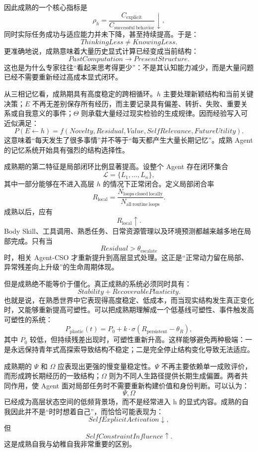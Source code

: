 因此成熟的一个核心指标是
\[
\rho_h
=
\frac{
C_{\mathrm{explicit}}
}{
C_{\mathrm{successful\ behavior}}
}
\downarrow,
\]
同时实际任务成功与适应能力并未下降，甚至持续提高。于是：
\[
\boxed{
ThinkingLess\neq KnowingLess.
}
\]
更准确地说，成熟意味着大量历史显式计算已经变成当前结构：
\[
PastComputation
\rightarrow
PresentStructure.
\]
这也是为什么专家往往“看起来思考得更少”：不是其认知能力减少，而是大量问题已经不需要重新经过高成本显式闭环。

从三相记忆看，成熟期具有高度稳定的跨相循环。$h$ 主要处理新颖结构和当前关键决策；$E$ 不再无差别保存所有经历，而主要记录具有偏差、转折、失败、重要关系或自我意义的事件；$\Theta$ 则承载大量经过现实检验的生成规律。因而经验写入可近似满足：
\[
P(E\leftarrow h)
=
f(
Novelty,
Residual,
Value,
SelfRelevance,
FutureUtility
).
\]
这意味着“每天发生了很多事情”并不等于“每天都产生大量长期记忆”。成熟 Agent 的记忆系统开始具有强烈的结构选择性。

成熟期的第二特征是局部闭环比例显著提高。设整个 Agent 存在闭环集合
\[
\mathcal L
=
\{
L_1,\ldots,L_n
\},
\]
其中一部分能够在不进入高层 $h$ 的情况下正常闭合。定义局部闭合率
\[
R_{\mathrm{local}}
=
\frac{
N_{\mathrm{loops\ closed\ locally}}
}{
N_{\mathrm{all\ routine\ loops}}
}.
\]
成熟以后，应有
\[
R_{\mathrm{local}}\uparrow.
\]
Body Skill、工具调用、熟悉任务、日常资源管理以及环境预测都越来越多地在局部完成。只有当
\[
Residual>\theta_{\mathrm{escalate}}
\]
时，相关 Agent-CSO 才重新提升到高层显式处理。这正是“正常动力留在局部、异常残差向上升级”的生命周期体现。

但是成熟绝不能等价于僵化。真正成熟的系统必须同时具有：
\[
Stability
+
RecoverablePlasticity.
\]
也就是说，在熟悉世界中它表现得高度稳定、低成本，而当现实结构发生真正变化时，又能够重新提高可塑性。可以把成熟期理解成一个低基线可塑性、事件触发高可塑性的系统：
\[
P_{\mathrm{plastic}}(t)
=
P_0
+
k
\cdot
\sigma
\left(
R_{\mathrm{persistent}}-\theta_R
\right),
\]
其中 $P_0$ 较低，但持续残差出现时，可塑性重新升高。这样能够避免两种极端：一是永远保持青年式高探索导致结构不稳定；二是完全停止结构变化导致无法适应。

成熟期的 $\Psi$ 和 $\Omega$ 应表现出更强的慢变量稳定性。$\Psi$ 不再主要依赖单一成败评价，而形成跨长期经历的一致结构；$\Omega$ 则为不同人生路径提供长期生成偏置。两者共同作用，使 Agent 面对局部任务时不需要重新构建价值和身份判断。可以认为：
\[
\Psi,\Omega
\]
已经成为高层状态空间的低频背景场，而不是经常进入 h 的显式内容。成熟的自我因此并不是“时时想着自己”，而恰恰可能表现为：
\[
SelfExplicitActivation
\downarrow,
\]
但
\[
SelfConstraintInfluence
\uparrow.
\]
这是成熟自我与幼稚自我非常重要的区别。

